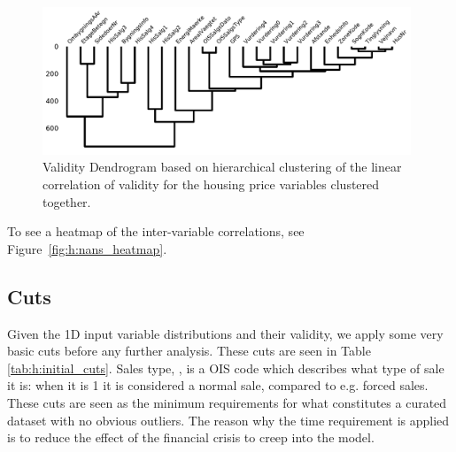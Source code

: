 \begin{figure}
  \includegraphics[width=0.98\textwidth, trim=35 10 0 10, clip]{figures/housing/missing_dendrogram.pdf}
  \caption[Validity Dendrogram]
          {Validity Dendrogram based on hierarchical clustering of the linear correlation of validity for the housing price variables clustered together.}
  \label{fig:h:nans_dendrogram}
\end{figure}

To see a heatmap of the inter-variable correlations, see Figure~\ref{fig:h:nans_heatmap}. 

\subsection{Cuts}
Given the 1D input variable distributions and their validity, we apply some very basic cuts before any further analysis. These cuts are seen in Table \ref{tab:h:initial_cuts}. Sales type, , is a OIS code which describes what type of sale it is: when it is \num{1} it is considered a normal sale, compared to e.g. forced sales. These cuts are seen as the minimum requirements for what constitutes a curated dataset with no obvious outliers. The reason why the time requirement is applied is to reduce the effect of the financial crisis to creep into the model. 

